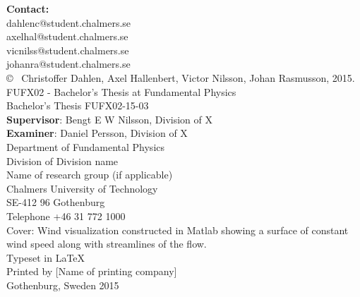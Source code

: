 \textbf{Contact:} \\
dahlenc@student.chalmers.se\\
axelhal@student.chalmers.se\\
vicnilss@student.chalmers.se\\
johanra@student.chalmers.se\\

\copyright ~ Christoffer Dahlen, Axel Hallenbert, Victor Nilsson, Johan Rasmusson, 2015.\\

FUFX02 - Bachelor's Thesis at Fundamental Physics\\
Bachelor's Thesis FUFX02-15-03\\

\textbf{Supervisor}: Bengt E W Nilsson, Division of X\\
\textbf{Examiner}: Daniel Persson, Division of X\\

Department of Fundamental Physics\\
Division of Division name\\
Name of research group (if applicable)\\
Chalmers University of Technology\\
SE-412 96 Gothenburg\\
Telephone +46 31 772 1000\\

\vfill
Cover: Wind visualization constructed in Matlab showing a surface of constant wind speed along with streamlines of the flow. \\

Typeset in \LaTeX \\
Printed by [Name of printing company]\\
Gothenburg, Sweden 2015
